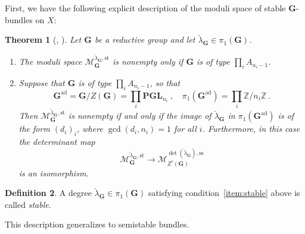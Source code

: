 \documentclass[10pt, a4paper]{amsart}
\newtheorem{theorem}{Theorem}[section]
\theoremstyle{definition}
\newtheorem{definition}[theorem]{Definition}
\theoremstyle{myitemstyle}
\newcommand{\Z}{\mathbb{Z}}
\newcommand{\lambdacheck}{\check{\lambda}}
\newcommand{\bfG}{\mathbf{G}}
\newcommand{\bPGL}{\mathbf{PGL}}
\newcommand{\mc}[1]{{\mathcal{#1}}}
\newcommand{\st}{\mathrm{st}}
\newcommand{\semist}{\mathrm{ss}}
\newcommand{\ad}{{\mathrm{ad}}}
\begin{document}
First, we have the following explicit description of the moduli space of stable $\bfG$-bundles on $X$:



\begin{theorem}[{\cite[Corollary 4.3]{fratila2016stack}}, {\cite[Theorem 1.4]{Fratila_revisitingelliptic}}] 
\label{thm:Fratilla determinant is isomorphism}
Let $\bfG$ be a reductive group and let $\lambdacheck_\bfG\in \pi_1(\bfG)$. 

\begin{enumerate}
    \item The moduli space $\mc M_\bfG^{\lambdacheck_\bfG,\st}$ is nonempty only if $\bfG$ is of type $\prod_i A_{n_i-1}$.

    \item \label{item:stable} Suppose that $\bfG$ is of type $\prod_i A_{n_i-1}$, so that
    \[
    \bfG^{\ad}=\bfG/Z(\bfG)=\prod_i \bPGL_{n_i} \ , \quad \pi_1(\bfG^{\ad})=\prod_i {\Z/n_i\Z} \ .
    \]
    Then $\mc M_\bfG^{\lambdacheck_\bfG,\st}$ is nonempty if and only if the image of $\lambdacheck_\bfG$ in $\pi_1(\bfG^{\ad})$ is of the form $(d_i)_i$, where $\gcd(d_i,n_i)=1$ for all $i$. Furthermore, in this case the determinant map
\[
    \mc M_\bfG^{\lambdacheck_\bfG,\st} \to \mc M_{Z^c(\bfG)}^{\det(\lambdacheck_\bfG),\semist}
\]
is an isomorphism. 

\end{enumerate}
\end{theorem}

\begin{definition}\label{def:stable_degree}
A degree $\lambdacheck_\bfG\in \pi_1(\bfG)$ satisfying condition~\eqref{item:stable} above is called \emph{stable}.
\end{definition}

This description generalizes to semistable bundles. 
\end{document}
